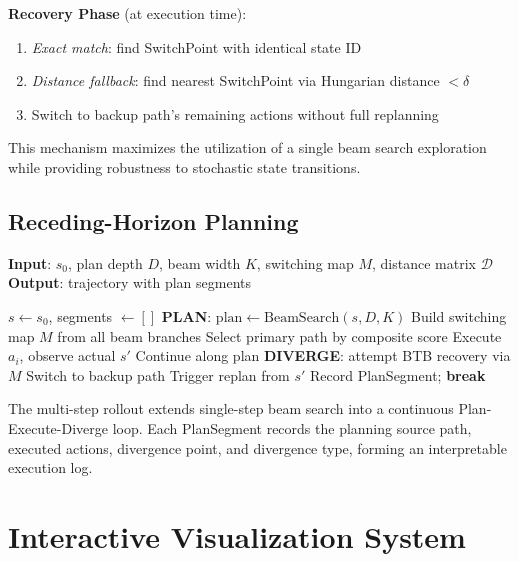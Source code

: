 \documentclass[letterpaper]{article}
\begin{document}
\textbf{Recovery Phase} (at execution time):
\begin{enumerate}
	\item \textit{Exact match}: find SwitchPoint with identical state ID
	\item \textit{Distance fallback}: find nearest SwitchPoint via Hungarian distance $< \delta$
	\item Switch to backup path's remaining actions without full replanning
\end{enumerate}

This mechanism maximizes the utilization of a single beam search exploration while providing robustness to stochastic state transitions.

\subsection{Receding-Horizon Planning}

\begin{algorithm}[t]
	\caption{Multi-Step Rollout with BTB Recovery}
	\label{alg:rollout}
	\textbf{Input}: $s_0$, plan depth $D$, beam width $K$, switching map $M$, distance matrix $\mathcal{D}$ \\
	\textbf{Output}: trajectory with plan segments
	\begin{algorithmic}[1]
		\STATE $s \leftarrow s_0$, segments $\leftarrow []$
		\STATE \textbf{PLAN}: $\text{plan} \leftarrow \text{BeamSearch}(s, D, K)$
		\STATE Build switching map $M$ from all beam branches
		\STATE Select primary path by composite score
		\STATE Execute $a_i$, observe actual $s'$
		\STATE Continue along plan
		\ELSE
		\STATE \textbf{DIVERGE}: attempt BTB recovery via $M$
		\STATE Switch to backup path
		\ELSE
		\STATE Trigger replan from $s'$
		\ENDIF
		\STATE Record PlanSegment; \textbf{break}
		\ENDIF
		\ENDFOR
		\ENDWHILE
	\end{algorithmic}
\end{algorithm}

The multi-step rollout extends single-step beam search into a continuous Plan-Execute-Diverge loop. Each PlanSegment records the planning source path, executed actions, divergence point, and divergence type, forming an interpretable execution log.


\section{Interactive Visualization System}
\label{sec:system}
\end{document}
